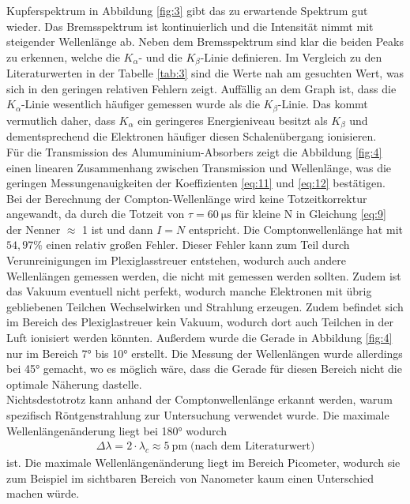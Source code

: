 \justifying Kupferspektrum in Abbildung \ref{fig:3} gibt das zu erwartende Spektrum gut
wieder. Das Bremsspektrum ist kontinuierlich und die Intensität nimmt mit steigender Wellenlänge ab.
Neben dem Bremsspektrum sind klar die beiden Peaks zu erkennen, welche die $K_{\alpha} $-
und die $K_{\beta} $-Linie definieren. Im Vergleich zu den Literaturwerten in der Tabelle \ref{tab:3}
sind die Werte nah am gesuchten Wert, was sich in den geringen relativen Fehlern zeigt.
Auffällig an dem Graph ist, dass die $K_{\alpha} $-Linie wesentlich häufiger gemessen wurde
als die $K_{\beta}$-Linie. Das kommt vermutlich daher, dass $K_{\alpha} $ ein
geringeres Energieniveau besitzt als $K_{\beta} $ und dementsprechend die 
Elektronen häufiger diesen Schalenübergang ionisieren.\\
Für die Transmission des Alumuminium-Absorbers zeigt die Abbildung
\ref{fig:4} einen linearen Zusammenhang zwischen Transmission und Wellenlänge,
was die geringen Messungenauigkeiten der Koeffizienten \eqref{eq:11} und \eqref{eq:12}
bestätigen.
Bei der Berechnung der Compton-Wellenlänge wird keine Totzeitkorrektur angewandt,
da durch die Totzeit von $\tau = \SI{60}{\micro\second} $ für kleine N in 
Gleichung \eqref{eq:9} der Nenner $\approx$ 1 ist und dann $I=N$ entspricht.
Die Comptonwellenlänge hat mit $54,97\%$ einen relativ großen Fehler. Dieser Fehler
kann zum Teil  durch Verunreinigungen im Plexiglasstreuer entstehen, wodurch auch andere 
Wellenlängen gemessen werden, die nicht mit gemessen werden sollten.
Zudem ist das Vakuum eventuell nicht perfekt, wodurch manche Elektronen mit
übrig gebliebenen Teilchen Wechselwirken und Strahlung erzeugen. Zudem befindet sich im 
Bereich des Plexiglastreuer kein Vakuum, wodurch dort auch Teilchen in der Luft
ionisiert werden könnten. Außerdem wurde die Gerade in Abbildung \ref{fig:4} nur im
Bereich 7° bis 10° erstellt. Die Messung der Wellenlängen wurde allerdings
bei 45° gemacht, wo es möglich wäre, dass die Gerade für diesen Bereich nicht
die optimale Näherung dastelle. \\
Nichtsdestotrotz kann anhand der Comptonwellenlänge erkannt werden, warum spezifisch 
Röntgenstrahlung zur Untersuchung verwendet wurde. Die maximale Wellenlängenänderung
liegt bei 180° wodurch 
\begin{align}
    \Delta \lambda = 2 \cdot \lambda _c \approx \SI{5}{\pico\meter} \;\text{(nach dem Literaturwert)}
\end{align}
ist. Die maximale Wellenlängenänderung liegt im Bereich Picometer, wodurch sie zum Beispiel im sichtbaren Bereich von Nanometer
kaum einen Unterschied machen würde.




\newpage
\printbibliography

